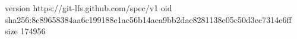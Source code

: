 version https://git-lfs.github.com/spec/v1
oid sha256:8c89658384aa6c199188e1ac56b14aea9bb2dae8281138e05c50d3ec7314e6ff
size 174956
